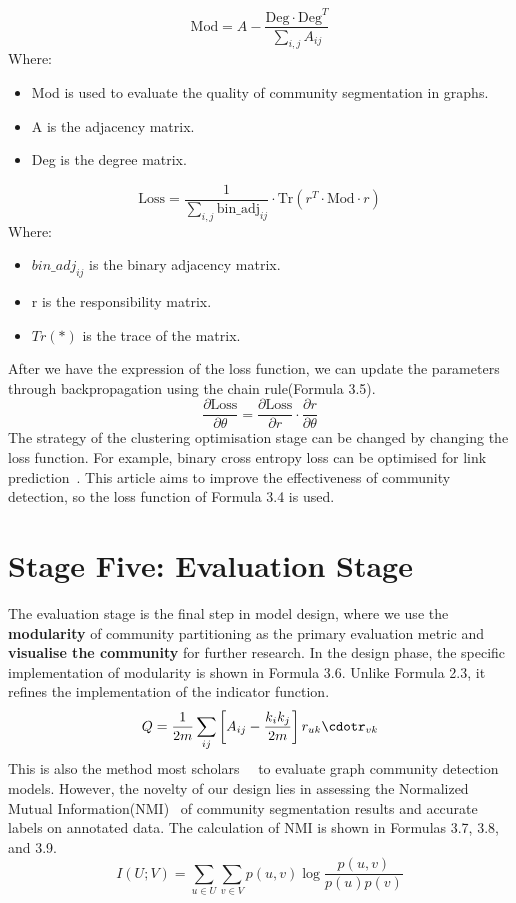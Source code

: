 \documentclass[ %
                    author={Tengyao Tu},
                supervisor={Dr. James Pope},
                    degree={MSc},
                     title={A New Perspective on Graph Community Detection: Combining Traditional Methods with Deep Learning Approaches},
                  subtitle={Applying to Telecom Networks and Diverse Datasets},
                      type={},
                      year={2024}]{dissertation}
\begin{document}
\begin{equation}
\text{Mod} = A - \frac{\text{Deg} \cdot \text{Deg}^T}{\sum_{i,j} A_{ij}}
\label{eq: Mod}
\end{equation}
Where:
\begin{itemize}
    \item Mod is used to evaluate the quality of community segmentation in graphs.
    \item A is the adjacency matrix.
    \item Deg is the degree matrix.
\end{itemize}
\begin{equation}
\text{Loss} = \frac{1}{\sum_{i,j} \text{bin\_adj}_{ij}} \cdot \text{Tr}(r^T \cdot \text{Mod} \cdot r)
\label{eq: Loss}
\end{equation}
Where:
\begin{itemize}
    \item $bin\_adj_{ij}$ is the binary adjacency matrix.
    \item r is the responsibility matrix.
    \item $Tr(*)$ is the trace of the matrix.
\end{itemize}
After we have the expression of the loss function, we can update the parameters through backpropagation using the chain rule(Formula 3.5).
\begin{equation}
\frac{\partial \text{Loss}}{\partial \theta} = \frac{\partial \text{Loss}}{\partial r} \cdot \frac{\partial r}{\partial \theta}
\label{eq: chain rule}
\end{equation}
The strategy of the clustering optimisation stage can be changed by changing the loss function. For example, binary cross entropy loss can be optimised for link prediction~\cite{kumar2020link}. This article aims to improve the effectiveness of community detection, so the loss function of Formula 3.4 is used.
\section{Stage Five: Evaluation Stage}
The evaluation stage is the final step in model design, where we use the \textbf{modularity} of community partitioning as the primary evaluation metric and \textbf{visualise the community} for further research. In the design phase, the specific implementation of modularity is shown in Formula 3.6. Unlike Formula 2.3, it refines the implementation of the indicator function.
\begin{equation}
Q = \frac{1}{2m} \sum_{ij} \left[ A_{ij} - \frac{k_i k_j}{2m} \right] r_{uk}\cdotr_{vk}
\label{eq:modularity2}
\end{equation}
This is also the method most scholars~\cite{wu2020deep}~\cite{agrawal2020community} to evaluate graph community detection models. However, the novelty of our design lies in assessing the Normalized Mutual Information(NMI)~\cite{zhang2015evaluating} of community segmentation results and accurate labels on annotated data. The calculation of NMI is shown in Formulas 3.7, 3.8, and 3.9.
\begin{equation}
I(U; V) = \sum_{u \in U} \sum_{v \in V} p(u, v) \log \frac{p(u, v)}{p(u)p(v)}
\label{eq: I(U,V)}
\end{equation}
\end{document}
